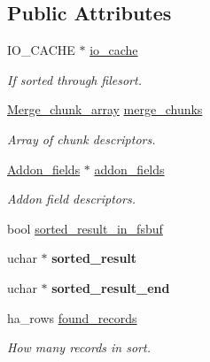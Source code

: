 \subsection*{Public Attributes}
\begin{DoxyCompactItemize}
\item 
\mbox{\label{classFilesort__info_a960fa2e906d86e5c69c77b6d6db54671}} 
I\+O\+\_\+\+C\+A\+C\+HE $\ast$ \mbox{\hyperlink{classFilesort__info_a960fa2e906d86e5c69c77b6d6db54671}{io\+\_\+cache}}
\begin{DoxyCompactList}\small\item\em If sorted through filesort. \end{DoxyCompactList}\item 
\mbox{\label{classFilesort__info_a95e8e2ab01ac8f488644c3df0f999355}} 
\mbox{\hyperlink{classBounds__checked__array}{Merge\+\_\+chunk\+\_\+array}} \mbox{\hyperlink{classFilesort__info_a95e8e2ab01ac8f488644c3df0f999355}{merge\+\_\+chunks}}
\begin{DoxyCompactList}\small\item\em Array of chunk descriptors. \end{DoxyCompactList}\item 
\mbox{\label{classFilesort__info_a111c59551bb8984a294a73ace40fa89a}} 
\mbox{\hyperlink{classAddon__fields}{Addon\+\_\+fields}} $\ast$ \mbox{\hyperlink{classFilesort__info_a111c59551bb8984a294a73ace40fa89a}{addon\+\_\+fields}}
\begin{DoxyCompactList}\small\item\em Addon field descriptors. \end{DoxyCompactList}\item 
bool \mbox{\hyperlink{classFilesort__info_a8d5e64f11beecff6917933a6aed9f475}{sorted\+\_\+result\+\_\+in\+\_\+fsbuf}}
\item 
\mbox{\label{classFilesort__info_afaa98babb42799a30a7141f25cf4d14f}} 
uchar $\ast$ {\bfseries sorted\+\_\+result}
\item 
\mbox{\label{classFilesort__info_a69dffc1d745fa9f9d66f9774bd6a7f80}} 
uchar $\ast$ {\bfseries sorted\+\_\+result\+\_\+end}
\item 
\mbox{\label{classFilesort__info_a04e1c3f73cc1c4eb87f0bbce16757081}} 
ha\+\_\+rows \mbox{\hyperlink{classFilesort__info_a04e1c3f73cc1c4eb87f0bbce16757081}{found\+\_\+records}}
\begin{DoxyCompactList}\small\item\em How many records in sort. \end{DoxyCompactList}\end{DoxyCompactItemize}


